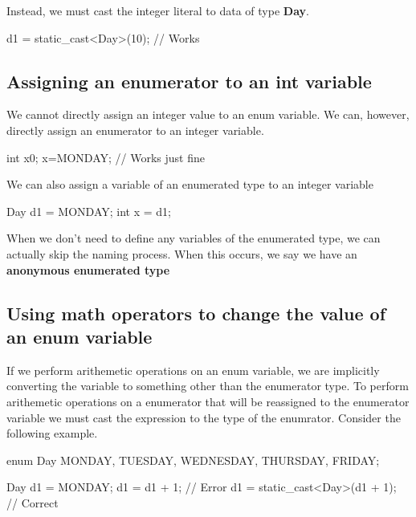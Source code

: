 \documentclass{report}
\begin{document}
    \bigbreak \noindent 
    Instead, we must cast the integer literal to data of type \textbf{Day}. 
    \bigbreak \noindent 
    
    \begin{cppcode}
d1 = static_cast<Day>(10); // Works
    \end{cppcode}
    

    \bigbreak \noindent 
    \subsection{Assigning an enumerator to an int variable}
    \bigbreak \noindent 
    We cannot directly assign an integer value to an enum variable. We can, however, directly assign an enumerator to an integer variable.
    \bigbreak \noindent 
    
    \begin{cppcode}
int x{0};
x=MONDAY; // Works just fine
    \end{cppcode}
    
    \bigbreak \noindent 
    We can also assign a variable of an enumerated type to an integer variable
    \bigbreak \noindent 
    
    \begin{cppcode}
Day d1 = MONDAY;
int x = d1;
    \end{cppcode}
    
    \bigbreak \noindent 
    When we don't need to define any variables of the enumerated type, we can actually skip the naming process. When this occurs, we say we have an \textbf{anonymous enumerated type}
    \bigbreak \noindent 
    \subsection{Using math operators to change the value of an enum variable}
    \bigbreak \noindent
    If we perform arithemetic operations on an enum variable, we are implicitly converting the variable to something other than the enumerator type. To perform arithemetic operations on a enumerator that will be reassigned to the enumerator variable we must cast the expression to the type of the enumrator. Consider the following example.
    \bigbreak \noindent 
    
    \begin{cppcode}
enum Day { MONDAY, TUESDAY, WEDNESDAY, THURSDAY, FRIDAY};

Day d1 = MONDAY;
d1 = d1 + 1; // Error
d1 = static_cast<Day>(d1 + 1); // Correct
    \end{cppcode}
    
\end{document}
